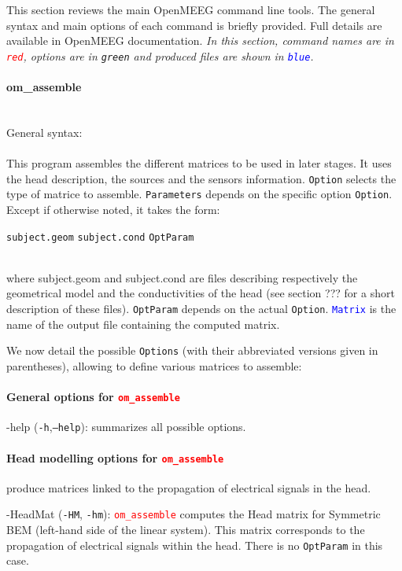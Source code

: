 \documentclass[10pt,journal]{book}
\newcommand{\command}[1]{\framebox[\textwidth][l]{\tt \$ #1}}
\newcommand{\commandTitle}[1]{\paragraph*{\textbf{#1}}\mbox{ }\\}
\newcommand{\commandName}[1]{\textcolor{red}{\tt #1}}
\newcommand{\optionName}[1]{\textcolor{OliveGreen}{\tt #1}}
\newcommand{\outputName}[1]{\textcolor{blue}{\tt #1}}
\newcommand{\Param}[1]{{\tt #1}}
\newcommand*\OptionsLabel[1]{\optionName{#1}}
\newenvironment{Options}{
    \begin{list}{}{
        \let\makelabel\OptionsLabel\setlength\labelwidth{30pt}%
        \setlength\leftmargin{\labelwidth+\labelsep}}}
    {\end{list}}
\begin{document}
This section reviews the main OpenMEEG command line tools. The general syntax and main options of each command is briefly provided.
Full details are available in OpenMEEG documentation. \emph{In this section, command names are in \commandName{red}, options are in \optionName{green} and produced files are shown in \outputName{blue}.}

    \newpage

    \commandTitle{om\_assemble}
        General syntax:\\[2mm]
        \command{\commandName{om\_assemble} \optionName{Option} \optionName{Parameters} \outputName{Matrix}}\\[2mm]
        This program assembles the different matrices to be used in
        later stages. It uses the head description, the sources and the sensors information. \optionName{Option} selects the type of matrice to assemble.
        \optionName{Parameters} depends on the specific option \optionName{Option}.
        Except if otherwise noted, it takes the form:\\
        \centerline{\Param{subject.geom} \Param{subject.cond} \optionName{OptParam}}\\
        where subject.geom and subject.cond are files describing respectively the geometrical model and the conductivities of the head (see section ???
        for a short description of these files). \optionName{OptParam} depends on the actual \optionName{Option}. \outputName{Matrix} is the name of the output file
        containing the computed matrix.

        We now detail the possible \optionName{Options} (with their abbreviated versions given in parentheses), allowing to define various matrices to assemble:

        \paragraph*{General options for \commandName{om\_assemble}}
            \begin{Options}
                \item[-help] (\optionName{-h},\optionName{--help}):  summarizes all possible options.
            \end{Options}

        \paragraph*{Head modelling options for \commandName{om\_assemble}} produce matrices linked to the propagation of electrical signals in the head.
            \begin{Options}
                \item[-HeadMat] (\optionName{-HM}, \optionName{-hm}): \commandName{om\_assemble} computes the Head matrix for Symmetric BEM (left-hand side
                        of the linear system). This matrix corresponds to the propagation of electrical signals within the head.
                        There is no \optionName{OptParam} in this case.
            \end{Options}
\end{document}

